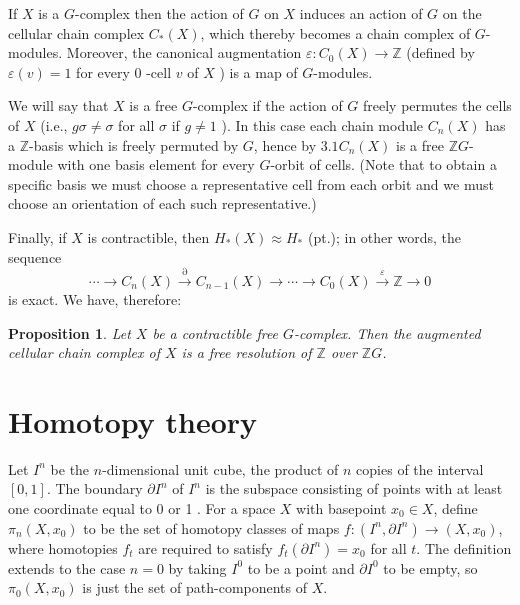 \documentclass{book}
\newtheorem{prop}{Proposition}
\begin{document}
If $X$ is a $G$-complex then the action of $G$ on $X$ induces an action of $G$ on the cellular chain complex $C_*(X)$, which thereby becomes a chain complex of $G$-modules. Moreover, the canonical augmentation $\varepsilon: C_0(X) \rightarrow \mathbb{Z}$ (defined by $\varepsilon(v)=1$ for every 0 -cell $v$ of $X$ ) is a map of $G$-modules.

We will say that $X$ is a free $G$-complex if the action of $G$ freely permutes the cells of $X$ (i.e., $g \sigma \neq \sigma$ for all $\sigma$ if $g \neq 1$ ). In this case each chain module $C_n(X)$ has a $\mathbb{Z}$-basis which is freely permuted by $G$, hence by $3.1 C_n(X)$ is a free $\mathbb{Z} G$-module with one basis element for every $G$-orbit of cells. (Note that to obtain a specific basis we must choose a representative cell from each orbit and we must choose an orientation of each such representative.)

Finally, if $X$ is contractible, then $H_*(X) \approx H_*$ (pt.); in other words, the sequence
$$
\cdots \rightarrow C_n(X) \stackrel{\partial}{\rightarrow} C_{n-1}(X) \rightarrow \cdots \rightarrow C_0(X) \stackrel{\varepsilon}{\rightarrow} \mathbb{Z} \rightarrow 0
$$
is exact. We have, therefore:

\begin{prop}
    
    Let $X$ be a contractible free $G$-complex. Then the augmented cellular chain complex of $X$ is a free resolution of $\mathbb{Z}$ over $\mathbb{Z} G$.
\end{prop}









\chapter{Homotopy theory}

Let $I^n$ be the $n$-dimensional unit cube, the product of $n$ copies of the interval $[0,1]$. The boundary $\partial I^n$ of $I^n$ is the subspace consisting of points with at least one coordinate equal to 0 or 1 . For a space $X$ with basepoint $x_0 \in X$, define $\pi_n\left(X, x_0\right)$ to be the set of homotopy classes of maps $f:\left(I^n, \partial I^n\right) \rightarrow\left(X, x_0\right)$, where homotopies $f_t$ are required to satisfy $f_t\left(\partial I^n\right)=x_0$ for all $t$. The definition extends to the case $n=0$ by taking $I^0$ to be a point and $\partial I^0$ to be empty, so $\pi_0\left(X, x_0\right)$ is just the set of path-components of $X$.
\end{document}
